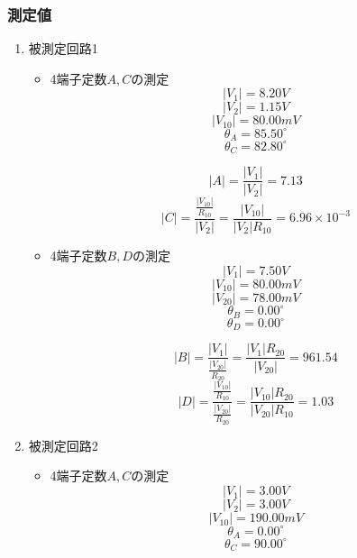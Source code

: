 \subsubsection{測定値}
    \begin{enumerate}
        \item 被測定回路1
        \begin{itemize}
            \item 4端子定数$A,C$の測定
            $$
            |V_1|=8.20V
            $$
            $$
            |V_2|=1.15V
            $$
            $$
            |V_{10}|=80.00mV
            $$
            $$
            \theta_A=85.50^\circ
            $$
            $$
            \theta_C=82.80^\circ
            $$

            $$
            |A|=\frac{\left|V_1\right|}{\left|V_2\right|}=7.13
            $$
            $$
            |C|=\frac{\frac{\left|V_{10}\right|}{R_{10}}}{\left|V_2\right|}=\frac{\left|V_{10}\right|}{\left|V_2\right| R_{10}}=6.96\times10^{-3}
            $$

            \item 4端子定数$B,D$の測定
            $$
            |V_1|=7.50V
            $$
            $$
            |V_{10}|=80.00mV
            $$
            $$
            |V_{20}|=78.00mV
            $$
            $$
            \theta_B=0.00^\circ
            $$
            $$
            \theta_D=0.00^\circ
            $$

            $$
            |B|=\frac{\left|V_1\right|}{\frac{\left|V_{20}\right|}{R_{20}}}=\frac{\left|V_1\right| R_{20}}{\left|V_{20}\right|}=961.54
            $$
            $$
            |D|=\frac{\frac{\left|V_{10}\right|}{R_{10}}}{\frac{\left|V_{20}\right|}{R_{20}}}=\frac{\left|V_{10}\right| R_{20}}{\left|V_{20}\right| R_{10}}=1.03
            $$

        \end{itemize}

        \newpage
        
        \item 被測定回路2
        \begin{itemize}
            \item 4端子定数$A,C$の測定
            $$
            |V_1|=3.00V
            $$
            $$
            |V_2|=3.00V
            $$
            $$
            |V_{10}|=190.00mV
            $$
            $$
            \theta_A=0.00^\circ
            $$
            $$
            \theta_C=90.00^\circ
            $$


\end{itemize}
\end{enumerate}
